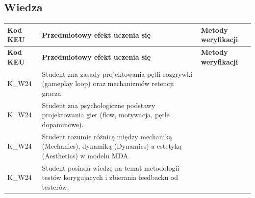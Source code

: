 \documentclass[12pt, a4paper]{article}
\newcommand{\thdrule}{\noalign{\global\setlength{\extrarowheight}{0pt}}}
\newcommand{\thdend}{\noalign{\global\setlength{\extrarowheight}{3pt}}}
\begin{document}
\subsection*{Wiedza}
{\scriptsize
\begin{longtable}{m{1.6cm}m{9.0cm}m{4.2cm}}
\thdrule\toprule
\rowcolor{pjatkRed} {\color{white}\footnotesize\textbf{\vphantom{Ag}Kod KEU}} & {\color{white}\footnotesize\textbf{\vphantom{Ag}Przedmiotowy efekt uczenia się}} & {\color{white}\footnotesize\textbf{\vphantom{Ag}Metody weryfikacji}} \\
\midrule\thdend
\endfirsthead
\thdrule\toprule
\rowcolor{pjatkRed} {\color{white}\footnotesize\textbf{\vphantom{Ag}Kod KEU}} & {\color{white}\footnotesize\textbf{\vphantom{Ag}Przedmiotowy efekt uczenia się}} & {\color{white}\footnotesize\textbf{\vphantom{Ag}Metody weryfikacji}} \\
\midrule\thdend
\endhead
  \rowcolor{tableRowLight} K\_W24 & Student zna zasady projektowania pętli rozgrywki (gameplay loop) oraz mechanizmów retencji gracza. &  \\
  \rowcolor{tableRowAlt} K\_W24 & Student zna psychologiczne podstawy projektowania gier (flow, motywacja, pętle dopaminowe). &  \\
  \rowcolor{tableRowLight} K\_W24 & Student rozumie różnicę między mechaniką (Mechanics), dynamiką (Dynamics) a estetyką (Aesthetics) w modelu MDA. &  \\
  \rowcolor{tableRowAlt} K\_W24 & Student posiada wiedzę na temat metodologii testów korygujących i zbierania feedbacku od testerów. &  \\
\bottomrule
\end{longtable}}
\end{document}
